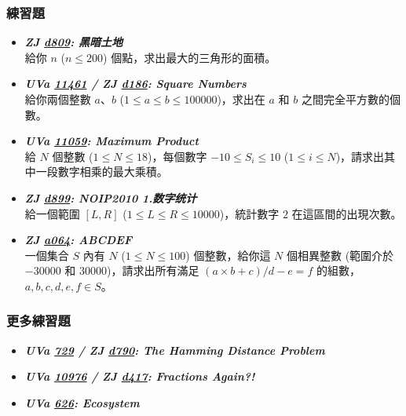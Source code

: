 \subsubsection*{練習題}
\begin{itemize}[label={\Checkmark}]
\item \textbf{\textit{ZJ \href{http://zerojudge.tw/ShowProblem?problemid=d809}{d809}: 黑暗土地}}\\
給你 $n$ ($n\leq{200}$) 個點，求出最大的三角形的面積。
\item \textbf{\textit{UVa \href{http://uva.onlinejudge.org/external/114/11461.html}{11461} / ZJ \href{http://zerojudge.tw/ShowProblem?problemid=d186}{d186}: Square Numbers}}\\
給你兩個整數 $a$、$b$ ($1\leq{a}\leq{b}\leq{100000}$)，求出在 $a$ 和 $b$ 之間完全平方數的個數。
\item \textbf{\textit{UVa \href{http://uva.onlinejudge.org/external/110/11059.html}{11059}: Maximum Product}}\\
給 $N$ 個整數 ($1\leq{N}\leq{18}$)，每個數字 $-10\leq{S_i}\leq{10}$ ($1\leq{i}\leq{N}$)，請求出其中一段數字相乘的最大乘積。
\item \textbf{\textit{ZJ \href{http://zerojudge.tw/ShowProblem?problemid=d899}{d899}: NOIP2010 1.数字统计}}\\
給一個範圍 $[L,R]$ ($1\leq{L}\leq{R}\leq{10000}$)，統計數字 $2$ 在這區間的出現次數。
\item \textbf{\textit{ZJ \href{http://zerojudge.tw/ShowProblem?problemid=a064}{a064}: ABCDEF}}\\
一個集合 $S$ 內有 $N$ ($1\leq{N}\leq{100}$) 個整數，給你這 $N$ 個相異整數 (範圍介於 $-30000$ 和 $30000$)，請求出所有滿足 $(a\times{b}+c)/d-e=f$ 的組數，$a,b,c,d,e,f\in{S}$。
\end{itemize}
\subsubsection*{更多練習題}
\begin{itemize}[label={\PencilLeftDown}]
\item \textbf{\textit{UVa \href{http://uva.onlinejudge.org/external/7/729.html}{729} / ZJ \href{http://zerojudge.tw/ShowProblem?problemid=d790}{d790}: The Hamming Distance Problem}}
\item \textbf{\textit{UVa \href{http://uva.onlinejudge.org/external/109/10976.html}{10976} / ZJ \href{http://zerojudge.tw/ShowProblem?problemid=d417}{d417}: Fractions Again?!}}
\item \textbf{\textit{UVa \href{http://uva.onlinejudge.org/external/6/626.html}{626}: Ecosystem}}
\end{itemize}
